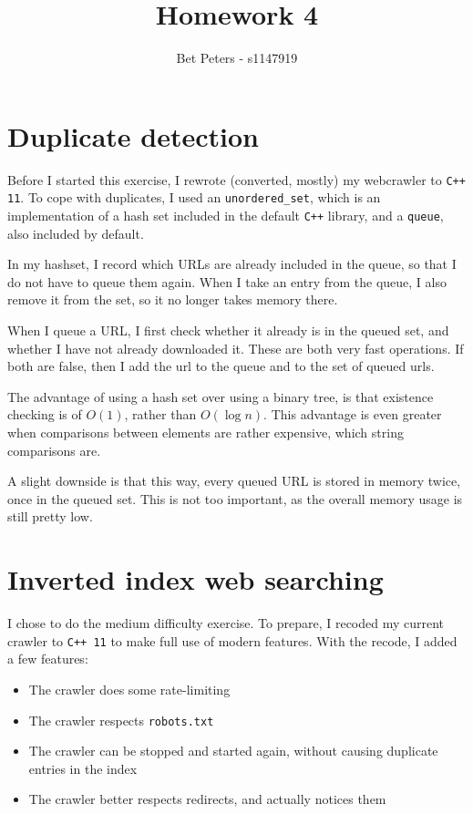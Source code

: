 \documentclass[12pt,a4paper]{article}
\author{Bet Peters - s1147919}
\title{Homework 4}
\begin{document}
\maketitle

\section{Duplicate detection}

Before I started this exercise, I rewrote (converted, mostly) my webcrawler to \texttt{C++ 11}. To cope with duplicates, I used an \texttt{unordered\_set}, which is an implementation of a hash set included in the default \texttt{C++} library, and a \texttt{queue}, also included by default.

In my hashset, I record which URLs are already included in the queue, so that I do not have to queue them again. When I take an entry from the queue, I also remove it from the set, so it no longer takes memory there.

When I queue a URL, I first check whether it already is in the queued set, and whether I have not already downloaded it. These are both very fast operations. If both are false, then I add the url to the queue and to the set of queued urls.

The advantage of using a hash set over using a binary tree, is that existence checking is of $O(1)$, rather than $O(\log n)$. This advantage is even greater when comparisons between elements are rather expensive, which string comparisons are.

A slight downside is that this way, every queued URL is stored in memory twice, once in the queued set. This is not too important, as the overall memory usage is still pretty low.

\section{Inverted index web searching}

I chose to do the medium difficulty exercise. To prepare, I recoded my current crawler to \texttt{C++ 11} to make full use of modern features. With the recode, I added a few features:
\begin{itemize}
	\item The crawler does some rate-limiting
	\item The crawler respects \texttt{robots.txt}
	\item The crawler can be stopped and started again, without causing duplicate entries in the index
	\item The crawler better respects redirects, and actually notices them
\end{itemize}
\end{document}
